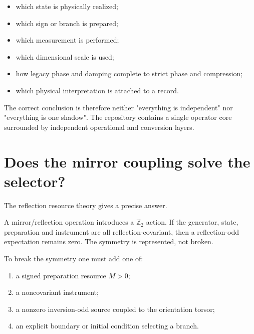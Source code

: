 \documentclass[11pt,a4paper,openany]{report}
\begin{document}
\begin{itemize}
\item 
which state is physically realized;

\item 
which sign or branch is prepared;

\item 
which measurement is performed;

\item 
which dimensional scale is used;

\item 
how legacy phase and damping complete to strict phase and compression;

\item 
which physical interpretation is attached to a record.

\end{itemize}

The correct conclusion is therefore neither "everything is independent" nor "everything is one shadow". The repository contains a single operator core surrounded by independent operational and conversion layers.

\section{Does the mirror coupling solve the selector?}

The reflection resource theory gives a precise answer.

A mirror/\allowbreak{}reflection operation introduces a \(\mathbb Z_2\) action. If the generator, state, preparation and instrument are all reflection-covariant, then a reflection-odd expectation remains zero. The symmetry is represented, not broken.

To break the symmetry one must add one of:

\begin{enumerate}
\item 
a signed preparation resource \(M>0\);

\item 
a noncovariant instrument;

\item 
a nonzero inversion-odd source coupled to the orientation torsor;

\item 
an explicit boundary or initial condition selecting a branch.

\end{enumerate}
\end{document}
